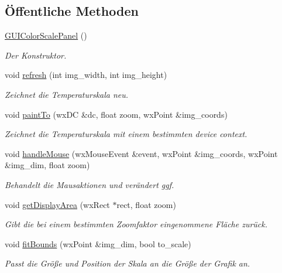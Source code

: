 \subsection*{Öffentliche Methoden}
\begin{DoxyCompactItemize}
\item 
\hyperlink{classGUIColorScalePanel_ad4ad453f831d149cc9fde46cba883431}{G\-U\-I\-Color\-Scale\-Panel} ()
\begin{DoxyCompactList}\small\item\em Der Konstruktor. \end{DoxyCompactList}\item 
void \hyperlink{classGUIColorScalePanel_a73f647d4f5eeb6b653777bb4c55696fa}{refresh} (int img\-\_\-width, int img\-\_\-height)
\begin{DoxyCompactList}\small\item\em Zeichnet die Temperaturskala neu. \end{DoxyCompactList}\item 
void \hyperlink{classGUIColorScalePanel_aaf6408cc09932a82afc7b2c233ec64c8}{paint\-To} (wx\-D\-C \&dc, float zoom, wx\-Point \&img\-\_\-coords)
\begin{DoxyCompactList}\small\item\em Zeichnet die Temperaturskala mit einem bestimmten device context. \end{DoxyCompactList}\item 
void \hyperlink{classGUIColorScalePanel_a59e27a091ec86d4c3e649f432a10ec08}{handle\-Mouse} (wx\-Mouse\-Event \&event, wx\-Point \&img\-\_\-coords, wx\-Point \&img\-\_\-dim, float zoom)
\begin{DoxyCompactList}\small\item\em Behandelt die Mausaktionen und verändert ggf. \end{DoxyCompactList}\item 
void \hyperlink{classGUIColorScalePanel_aa7d5eb68ecd55e23b2e8969a21c32a22}{get\-Display\-Area} (wx\-Rect $\ast$rect, float zoom)
\begin{DoxyCompactList}\small\item\em Gibt die bei einem bestimmten Zoomfaktor eingenommene Fläche zurück. \end{DoxyCompactList}\item 
void \hyperlink{classGUIColorScalePanel_ac8faaae6f7016f0fecedfc350b65644b}{fit\-Bounds} (wx\-Point \&img\-\_\-dim, bool to\-\_\-scale)
\begin{DoxyCompactList}\small\item\em Passt die Größe und Position der Skala an die Größe der Grafik an. \end{DoxyCompactList}\item 

\end{DoxyCompactItemize}
